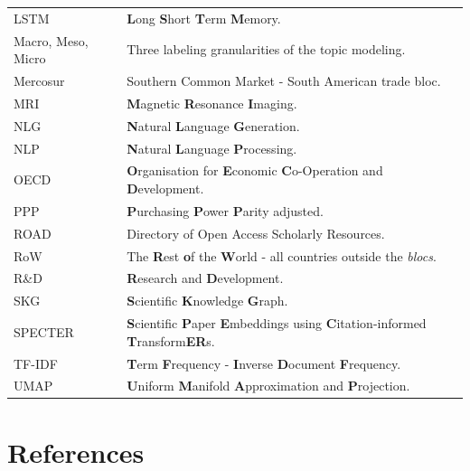 \documentclass{article}
\begin{document}
\begin{table}[htbp]
\begin{threeparttable}
{\begin{tabular*}{\textwidth}{@{\extracolsep{\fill}}ll}
					LSTM & \textbf{L}ong \textbf{S}hort \textbf{T}erm \textbf{M}emory. \\
					Macro, Meso, Micro & Three labeling granularities of the topic modeling. \\
					Mercosur & Southern Common Market - South American trade bloc. \\
					MRI & \textbf{M}agnetic \textbf{R}esonance \textbf{I}maging. \\
					NLG & \textbf{N}atural \textbf{L}anguage \textbf{G}eneration. \\
					NLP & \textbf{N}atural \textbf{L}anguage \textbf{P}rocessing. \\
					OECD & \textbf{O}rganisation for \textbf{E}conomic \textbf{C}o-Operation and \textbf{D}evelopment. \\
					PPP & \textbf{P}urchasing \textbf{P}ower \textbf{P}arity adjusted. \\				
					ROAD & Directory of Open Access Scholarly Resources. \\
					RoW & The \textbf{R}est \textbf{o}f the \textbf{W}orld - all countries outside the \textit{blocs}. \\
					R\&D & \textbf{R}esearch and \textbf{D}evelopment. \\
					SKG & \textbf{S}cientific \textbf{K}nowledge \textbf{G}raph. \\
					SPECTER & \textbf{S}cientific \textbf{P}aper \textbf{E}mbeddings using \textbf{C}itation-informed \textbf{T}ransform\textbf{ER}s. \\
					TF-IDF & \textbf{T}erm \textbf{F}requency - \textbf{I}nverse \textbf{D}ocument \textbf{F}requency. \\
					UMAP & \textbf{U}niform \textbf{M}anifold \textbf{A}pproximation and \textbf{P}rojection. \vspace{0.5em} \\
					
					\hline
				\end{tabular*}
			}
			\vspace{1em}
		\end{threeparttable}
		\vspace{1em}
	\end{table}
	
	
	
	\clearpage
	\twocolumn
	
	\section{References}
	
	\printbibliography[heading=none]
\end{document}
